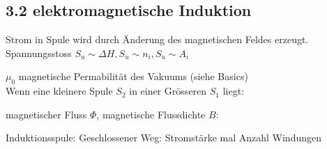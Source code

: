 \subsection*{3.2 elektromagnetische Induktion}
    Strom in Spule wird durch Änderung des magnetischen Feldes erzeugt.
    Spannungsstoss
    $ S_u \sim \Delta H, S_u \sim n_i, S_u \sim A_i$
    

    $\mu_0$ magnetische Permabilität des Vakuums (siehe Basics)\\
    Wenn eine kleinere Spule $S_2$ in einer Grösseren $S_1$ liegt: 

    magnetischer Fluss $\Phi$, magnetische Flussdichte $B$:

    Induktionsspule: 
    Geschlossener Weg:  Stromstärke mal Anzahl Windungen